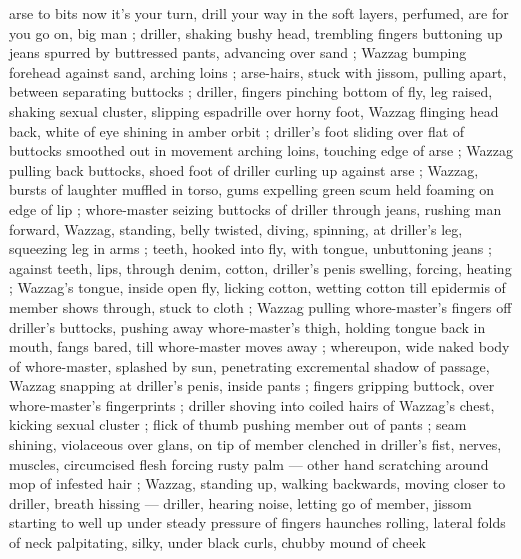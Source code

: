 {arse to bits{\thd} now it's your turn, drill your way in{\td} the soft layers, perfumed, are for you{\td} go on, big man} ; driller, shaking bushy head, trembling fingers buttoning up jeans spurred by buttressed pants, advancing over sand ; Wazzag bumping forehead against sand, arching loins ; arse-hairs, stuck with jissom, pulling apart, between separating buttocks ; driller, fingers pinching bottom of fly, leg raised, shaking sexual cluster, slipping espadrille over horny foot, Wazzag flinging head back, white of eye shining in amber orbit ; driller's foot sliding over flat of buttocks smoothed out in movement arching loins, touching edge of arse ; Wazzag pulling back buttocks, shoed foot of driller curling up against arse ; Wazzag, bursts of laughter muffled in torso, gums expelling green scum held foaming on edge of lip ; whore-master seizing buttocks of driller through jeans, rushing man forward, Wazzag, standing, belly twisted, diving, spinning, at driller's leg, squeezing leg in arms ; teeth, hooked into fly, with tongue, unbuttoning jeans ; against teeth, lips, through denim, cotton, driller's penis swelling, forcing, heating ; Wazzag's tongue, inside open fly, licking cotton, wetting cotton till epidermis of member shows through, stuck to cloth ; Wazzag pulling whore-master's fingers off driller's buttocks, pushing away whore-master's thigh, holding tongue back in mouth, fangs bared, till whore-master moves away ; whereupon, wide naked body of whore-master, splashed by sun, penetrating excremental shadow of passage, Wazzag snapping at driller's penis, inside pants ; fingers gripping buttock, over whore-master's fingerprints ; driller shoving into coiled hairs of Wazzag's chest, kicking sexual cluster ; flick of thumb pushing member out of pants ; seam shining, violaceous over glans, on tip of member clenched in driller's fist, nerves, muscles, circumcised flesh forcing rusty palm --- other hand scratching around mop of infested hair ; Wazzag, standing up, walking backwards, moving closer to driller, breath hissing --- driller, hearing noise, letting go of member, jissom starting to well up under steady pressure of fingers {\dashcom} haunches rolling, lateral folds of neck palpitating, silky, under black curls, chubby mound of cheek 
